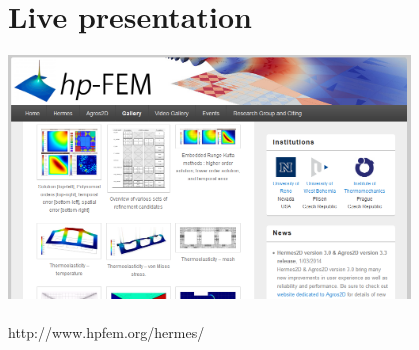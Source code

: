 \documentclass{beamer}
\begin{document}
\section{Live presentation}

\begin{frame}
\begin{center}
    \includegraphics[width=0.8\textwidth]{final.png}\\ \ \\
http://www.hpfem.org/hermes/
\end{center}
\end{frame}
\end{document}
